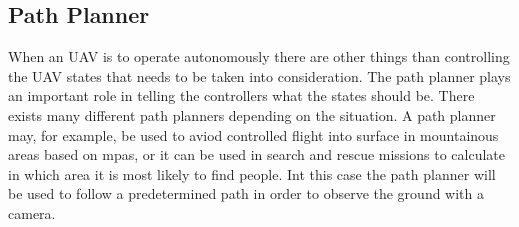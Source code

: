 \subsection{Path Planner}
When an UAV is to operate autonomously there are other things than controlling the UAV states that needs to be taken into consideration. The path planner plays an important role in telling the controllers what the states should be. There exists many different path planners depending on the situation. A path planner may, for example, be used to aviod controlled flight into surface in mountainous areas based on mpas, or it can be used in search and rescue missions to calculate in which area it is most likely to find people. Int this case the path planner will be used to follow a predetermined path in order to observe the ground with a camera.